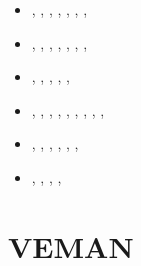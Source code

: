 \begin{small}
\begin{itemize}
                             \textcite{bemc18},  \textcite{mord18},
                             \textcite{wakc18},  \textcite{wakc18b}
\item[\twothousandnineteen]  \textcite{samo19},  \textcite{yamg19}, 
                             \textcite{canc19},  \textcite{cakc19},
                             \textcite{sams19b}, \textcite{bore19},
                             \textcite{smbc19},  \textcite{canc19b}
\item[\twothousandtwenty]      \textcite{magm20},  \textcite{sams20},  \textcite{capi20}, 
                               \textcite{ghbm20},  \textcite{canc20},  \textcite{cofm20},
                               \textcite{gumc20},  \textcite{sche20}
\item[\twothousandtwentyone]   \textcite{kotr21},  \textcite{qizx21},
                               \textcite{stsc21},  \textcite{zhzl21},
                               \textcite{xiwk21},  \textcite{kncw21}
\item[\twothousandtwentytwo]   \textcite{wakw22},  \textcite{alrr22b}, \textcite{pefv22},
                               \textcite{olgr22},  \textcite{bahf22},  \textcite{canm22},
                               \textcite{wacw22},  \textcite{baha22},  \textcite{zugc22},
                               \textcite{aryt22}
\item[\twothousandtwentythree] \textcite{lass23}, \textcite{giln23}, \textcite{yaat23},
                               \textcite{scsb23}, \textcite{mord23}, \textcite{ligu23a},
                               \textcite{ligu23b}
\item[\twothousandtwentyfour]  \textcite{deyz24}, \textcite{gucm24}, \textcite{yuga24},
                               \textcite{comi24}, \textcite{waxu24}

\end{itemize}
\end{small}



\section{VEMAN}

